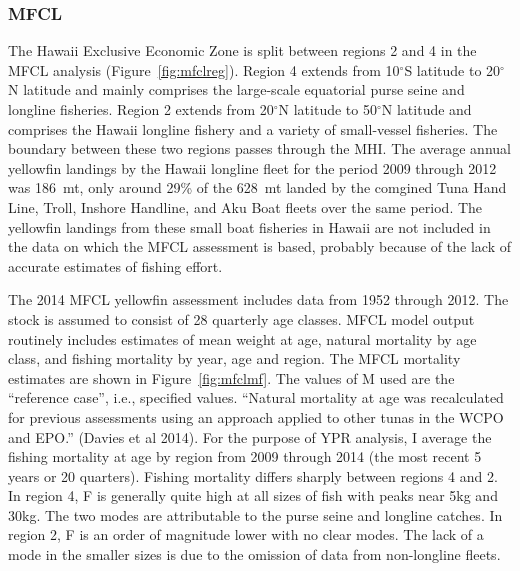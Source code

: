 \documentclass[12pt,letterpaper]{article}
\renewcommand\deg[1]{$^\circ$#1}
\newcommand\help[1]{\color{Magenta}{\it #1 }\normalcolor}
\begin{document}
\subsubsection*{MFCL}
The Hawaii Exclusive Economic Zone is split between regions 2 and 4
in the MFCL analysis (Figure~\ref{fig:mfclreg}). 
Region 4 extends from
10\deg{S} latitude to 20\deg{N} latitude and mainly comprises 
the large-scale equatorial purse seine and longline fisheries.
Region 2 extends from 20\deg{N} latitude to 50\deg{N} latitude
and comprises the Hawaii longline fishery and a variety of
small-vessel fisheries.
The boundary between these two regions passes through the MHI. 
The average annual yellowfin landings by the Hawaii longline fleet for
the period 2009 through 2012 was 186~mt, only around 29\% of the
628~mt landed by the comgined Tuna Hand Line, Troll, Inshore Handline, and Aku
Boat fleets over the same period.
The yellowfin landings from these small boat fisheries in Hawaii are not
included in the data on which the MFCL assessment is based, probably
because of the lack of accurate estimates of fishing effort.



The 2014 MFCL yellowfin assessment includes data from 1952 through
2012. The stock is assumed to consist of 28 quarterly age classes. 
MFCL model output routinely includes estimates of mean weight at age,
natural mortality by age class, and fishing mortality by year, age
and region. 
The MFCL mortality estimates are shown in Figure~\ref{fig:mfclmf}. 
The values of M used are the ``reference case'', i.e.,
specified values.
``Natural mortality at age was recalculated for previous assessments
using an approach applied to other tunas in the WCPO and EPO.'' 
(Davies et al 2014).
For the purpose of YPR analysis, I average the fishing
mortality at age by region from 2009 through 2014 (the most recent 5
years or 20 quarters). 
Fishing mortality differs sharply between regions 4 and 2. In region
4, F is generally quite high at all sizes of fish with peaks near 5kg
and 30kg. The two modes are attributable to the purse seine and
longline catches.
In region 2, F is an order of magnitude lower with no clear
modes. The lack of a mode in the smaller sizes is due to the omission
of data from non-longline fleets.
\end{document}
